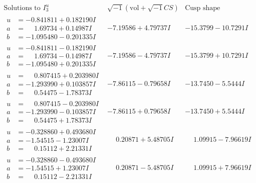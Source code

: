 \documentclass[1p]{elsarticle_modified}
\theoremstyle{definition}
\newcommand{\I}{\sqrt{-1}}
\begin{document}
$$\begin{array}{c|c|c}  
\text{Solutions to }I^u_{3}& \I (\text{vol} + \sqrt{-1}CS) & \text{Cusp shape}\\
 \hline 
\begin{aligned}
u &= -0.841811 + 0.182190 I \\
a &= \phantom{-}1.69734 + 0.14987 I \\
b &= -1.095480 - 0.201335 I\end{aligned}
 & -7.19586 + 4.79737 I & -15.3799 - 10.7291 I \\ \hline\begin{aligned}
u &= -0.841811 - 0.182190 I \\
a &= \phantom{-}1.69734 - 0.14987 I \\
b &= -1.095480 + 0.201335 I\end{aligned}
 & -7.19586 - 4.79737 I & -15.3799 + 10.7291 I \\ \hline\begin{aligned}
u &= \phantom{-}0.807415 + 0.203980 I \\
a &= -1.293990 + 0.103857 I \\
b &= \phantom{-}0.54475 - 1.78373 I\end{aligned}
 & -7.86115 - 0.79658 I & -13.7450 - 5.5444 I \\ \hline\begin{aligned}
u &= \phantom{-}0.807415 - 0.203980 I \\
a &= -1.293990 - 0.103857 I \\
b &= \phantom{-}0.54475 + 1.78373 I\end{aligned}
 & -7.86115 + 0.79658 I & -13.7450 + 5.5444 I \\ \hline\begin{aligned}
u &= -0.328860 + 0.493680 I \\
a &= -1.54515 - 1.23007 I \\
b &= \phantom{-}0.15112 + 2.21331 I\end{aligned}
 & \phantom{-}0.20871 + 5.48705 I & \phantom{-}1.09915 - 7.96619 I \\ \hline\begin{aligned}
u &= -0.328860 - 0.493680 I \\
a &= -1.54515 + 1.23007 I \\
b &= \phantom{-}0.15112 - 2.21331 I\end{aligned}
 & \phantom{-}0.20871 - 5.48705 I & \phantom{-}1.09915 + 7.96619 I \\ \hline\begin{aligned}

\end{aligned}
\end{array}$$
\end{document}
